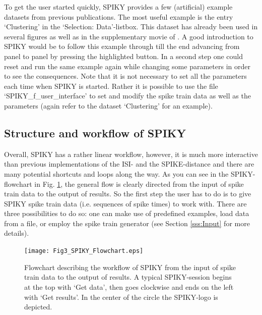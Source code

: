 \documentclass[10pt,twocolumn]{elsart5p}
\begin{document}
To get the user started quickly, SPIKY provides a few (artificial) example datasets from previous publications. The most useful example is the entry `Clustering' in the `Selection: Data'-listbox. This dataset has already been used in several figures as well as in the supplementary movie of \cite{Kreuz13}. A good introduction to SPIKY would be to follow this example through till the end advancing from panel to panel by pressing the highlighted button. In a second step one could reset and run the same example again while changing some parameters in order to see the consequences. Note that it is not necessary to set all the parameters each time when SPIKY is started. Rather it is possible to use the file `SPIKY\_f\_user\_interface' to set and modify the spike train data as well as the parameters (again refer to the dataset `Clustering' for an example).


\subsection{\label{ss:Structure} Structure and workflow of SPIKY}

Overall, SPIKY has a rather linear workflow, however, it is much more interactive than previous implementations of the ISI- and the SPIKE-distance and there are many potential shortcuts and loops along the way. As you can see in the SPIKY-flowchart in Fig. \ref{fig:Fig3-SPIKY-Flowchart}, the general flow is clearly directed from the input of spike train data to the output of results. So the first step the user has to do is to give SPIKY spike train data (i.e. sequences of spike times) to work with. There are three possibilities to do so: one can make use of predefined examples, load data from a file, or employ the spike train generator (see Section \ref{sss:Input} for more details).
%
%
\begin{figure}
    \texttt{[image: Fig3\_SPIKY\_Flowchart.eps]}
    \caption{\abb\label{fig:Fig3-SPIKY-Flowchart} Flowchart describing the workflow of SPIKY from 	the input of spike train data to the output of results. A typical SPIKY-session begins at the top with `Get data', then goes clockwise and ends on the left with `Get results'. In the center of the circle the SPIKY-logo is depicted.}
\end{figure}
%
\end{document}
